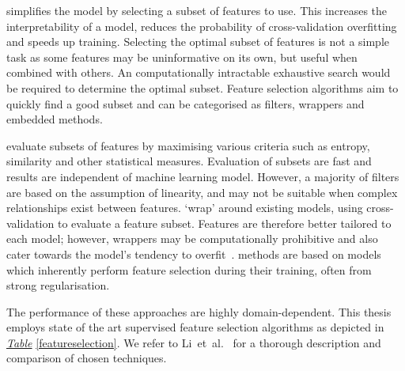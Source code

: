 \documentclass[12pt, twoside]{book}
\renewcommand\emph[1]{\textit{\color{USred}{#1}}}
\begin{document}
\emph{Feature selection} simplifies the model by selecting a subset of features to use. This increases the interpretability of a model, reduces the probability of cross-validation overfitting~\cite{overfittingcv} and speeds up training. Selecting the optimal subset of features is not a simple task as some features may be uninformative on its own, but useful when combined with others. An computationally intractable exhaustive search would be required to determine the optimal subset. Feature selection algorithms aim to quickly find a good subset and can be categorised as filters, wrappers and embedded methods. 

\emph{Filters} evaluate subsets of features by maximising various criteria such as entropy, similarity and other statistical measures. Evaluation of subsets are fast and results are independent of machine learning model. However, a majority of filters are based on the assumption of linearity, and may not be suitable when complex relationships exist between features. \emph{Wrappers} `wrap' around existing models, using cross-validation to evaluate a feature subset. Features are therefore better tailored to each model; however, wrappers may be computationally prohibitive and also cater towards the model's tendency to overfit~\cite{wrapperoverfit}. \emph{Embedded} methods are based on models which inherently perform feature selection during their training, often from strong regularisation. 

The performance of these approaches are highly domain-dependent. This thesis employs state of the art supervised feature selection algorithms as depicted in \textit{\hyperref[featureselection]{Table}} \ref{featureselection}.  We refer to Li~et~al.~\cite{skfeature} for a thorough description and comparison of chosen techniques. 
\end{document}
